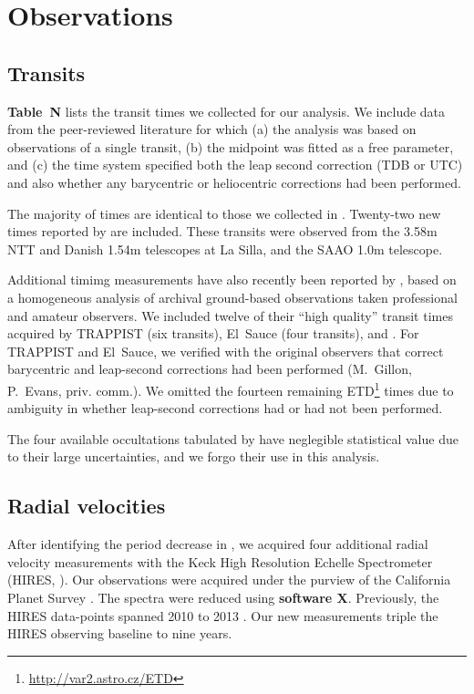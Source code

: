 \documentclass[12pt,twocolumn,tighten]{aastex62}
\begin{document}
\section{Observations}
\label{sec:observations}

\subsection{Transits}

{\bf Table~N} lists the transit times we collected for our analysis.
We include data from the peer-reviewed literature for which (a) the
analysis was based on observations of a single transit, (b) the
midpoint was fitted as a free parameter, and (c) the time system
specified both the leap second correction (TDB or UTC) and also
whether any barycentric or heliocentric corrections had been
performed.

The majority of times are identical to those we collected in
.  Twenty-two new times reported by
\citet{southworth_transit_2019} are included.  These transits were
observed from the 3.58m NTT and Danish 1.54m telescopes at La Silla,
and the SAAO 1.0m telescope.

Additional timimg measurements have also recently been reported by
\citet{baluev_2019}, based on a homogeneous analysis of archival
ground-based observations taken professional and amateur observers.
We included twelve of their ``high quality'' transit times acquired by
TRAPPIST (six transits), El~Sauce (four transits), and
\citet{petrucci_no_2013}.  For TRAPPIST and El~Sauce, we verified with
the original observers that correct barycentric and leap-second
corrections had been performed (M.~Gillon, P.~Evans, priv{.} comm{.}).
We omitted the fourteen remaining \citeauthor{baluev_2019}
ETD\footnote{\url{http://var2.astro.cz/ETD}} times due to ambiguity in
whether leap-second corrections had or had not been performed.

The four available occultations tabulated by
 have neglegible statistical value due
to their large uncertainties, and we forgo their use in this analysis.

\subsection{Radial velocities}

After identifying the period decrease in
, we acquired four additional radial
velocity measurements with the Keck High Resolution Echelle
Spectrometer (HIRES, \citealt{vogt_hires_1994}).  Our observations
were acquired under the purview of the California Planet Survey
\citep{howard_cps_2010}.  The spectra were reduced using {\bf software
X}.  Previously, the HIRES data-points spanned 2010 to 2013
\citep{knutson_friends_2014}.  Our new measurements triple the HIRES
observing baseline to nine years.
\end{document}
